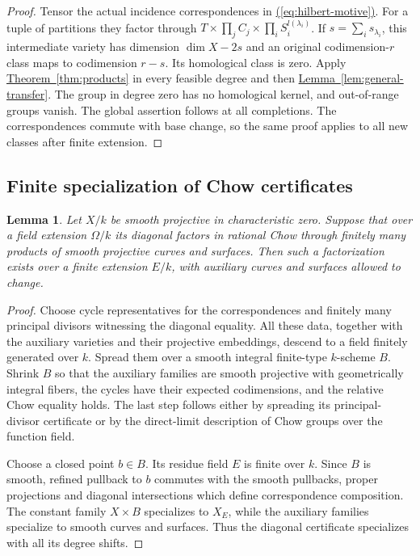 \documentclass[11pt,a4paper]{article}
\newtheorem{lemma}[theorem]{Lemma}
\theoremstyle{definition}
\theoremstyle{remark}\newtheorem{remark}[theorem]{Remark}
\numberwithin{equation}{section}
\newcommand{\thmref}[1]{\hyperref[#1]{\textcolor{resultlink}{Theorem~\ref*{#1}}}}
\newcommand{\lemref}[1]{\hyperref[#1]{\textcolor{resultlink}{Lemma~\ref*{#1}}}}
\renewcommand{\eqref}[1]{\hyperref[#1]{\textcolor{equationlink}{(\ref*{#1})}}}
\begin{document}
\begin{proof}
Tensor the actual incidence correspondences in
\eqref{eq:hilbert-motive}. For a tuple of partitions they factor
through $T\times\prod_j C_j\times\prod_i S_i^{l(\lambda_i)}$.
If $s=\sum_i s_{\lambda_i}$, this intermediate variety has
dimension $\dim X-2s$ and an original codimension-$r$ class maps
to codimension $r-s$. Its homological class is zero. Apply
\thmref{thm:products} in every feasible degree and then
\lemref{lem:general-transfer}. The group in degree zero has no
homological kernel, and out-of-range groups vanish. The global
assertion follows at all completions. The correspondences commute
with base change, so the same proof applies to all new classes
after finite extension.
\end{proof}

\subsection{Finite specialization of Chow certificates}

\begin{lemma}\label{lem:specialize-certificate}
Let $X/k$ be smooth projective in characteristic zero. Suppose that
over a field extension $\Omega/k$ its diagonal factors in rational
Chow through finitely many products of smooth projective curves and
surfaces. Then such a factorization exists over a finite extension
$E/k$, with auxiliary curves and surfaces allowed to change.
\end{lemma}

\begin{proof}
Choose cycle representatives for the correspondences and finitely
many principal divisors witnessing the diagonal equality. All these
data, together with the auxiliary varieties and their projective
embeddings, descend to a field finitely generated over $k$. Spread
them over a smooth integral finite-type $k$-scheme $B$. Shrink $B$
so that the auxiliary families are smooth projective with
geometrically integral fibers, the cycles have their expected
codimensions, and the relative Chow equality holds. The last step
follows either by spreading its principal-divisor certificate or by
the direct-limit description of Chow groups over the function field.

Choose a closed point $b\in B$. Its residue field $E$ is finite over
$k$. Since $B$ is smooth, refined pullback to $b$ commutes with
the smooth pullbacks, proper projections and diagonal intersections
which define correspondence composition. The constant family
$X\times B$ specializes to $X_E$, while the auxiliary families
specialize to smooth curves and surfaces. Thus the diagonal
certificate specializes with all its degree shifts.
\end{proof}
\end{document}

